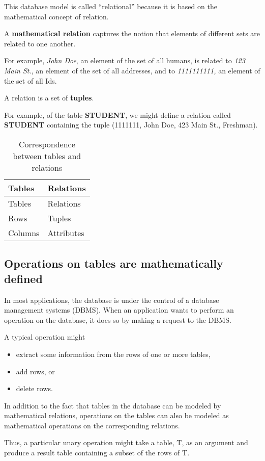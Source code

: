 \documentclass[]{article}
\providecommand{\tightlist}{%
  \setlength{\itemsep}{0pt}\setlength{\parskip}{0pt}}
\begin{document}
This database model is called ``relational'' because it is based on the
mathematical concept of relation.

A \textbf{mathematical relation} captures the notion that elements of
different sets are related to one another.

For example, \emph{John Doe}, an element of the set of all humans, is
related to \emph{123 Main St.}, an element of the set of all addresses,
and to \emph{1111111111,} an element of the set of all Ids.

A relation is a set of \textbf{tuples}.

For example, of the table \textbf{STUDENT}, we might define a relation
called \textbf{STUDENT} containing the tuple (1111111, John Doe, 423
Main St., Freshman).

\begin{longtable}[]{@{}ll@{}}
\caption{Correspondence between tables and relations}\tabularnewline
\toprule
Tables & Relations\tabularnewline
\midrule
\endfirsthead
\toprule
Tables & Relations\tabularnewline
\midrule
\endhead
Rows & Tuples\tabularnewline
Columns & Attributes\tabularnewline
\bottomrule
\end{longtable}

\hypertarget{operations-on-tables-are-mathematically-defined}{%
\subsection{Operations on tables are mathematically
defined}\label{operations-on-tables-are-mathematically-defined}}

In most applications, the database is under the control of a database
management systems (DBMS). When an application wants to perform an
operation on the database, it does so by making a request to the DBMS.

A typical operation might

\begin{itemize}
\tightlist
\item
  extract some information from the rows of one or more tables,
\item
  add rows, or
\item
  delete rows.
\end{itemize}

In addition to the fact that tables in the database can be modeled by
mathematical relations, operations on the tables can also be modeled as
mathematical operations on the corresponding relations.

Thus, a particular unary operation might take a table, T, as an argument
and produce a result table containing a subset of the rows of T.
\end{document}
